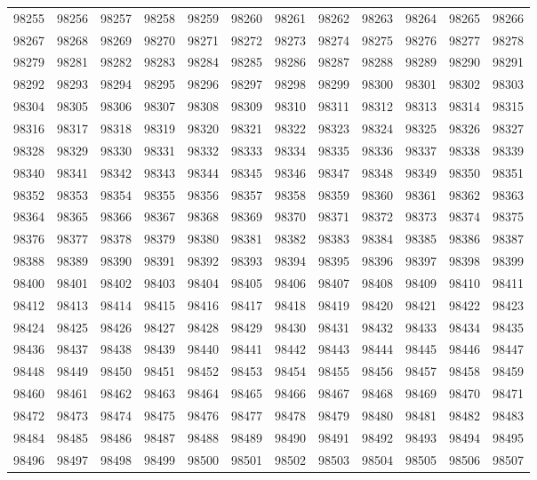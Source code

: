\begin{center}
\begin{longtable}{llllllllllll}
98255 &98256 &98257 &98258 &98259 &98260 &98261 &98262 &98263 &98264 &98265 &98266 \\
98267 &98268 &98269 &98270 &98271 &98272 &98273 &98274 &98275 &98276 &98277 &98278 \\
98279 &98281 &98282 &98283 &98284 &98285 &98286 &98287 &98288 &98289 &98290 &98291 \\
98292 &98293 &98294 &98295 &98296 &98297 &98298 &98299 &98300 &98301 &98302 &98303 \\
98304 &98305 &98306 &98307 &98308 &98309 &98310 &98311 &98312 &98313 &98314 &98315 \\
98316 &98317 &98318 &98319 &98320 &98321 &98322 &98323 &98324 &98325 &98326 &98327 \\
98328 &98329 &98330 &98331 &98332 &98333 &98334 &98335 &98336 &98337 &98338 &98339 \\
98340 &98341 &98342 &98343 &98344 &98345 &98346 &98347 &98348 &98349 &98350 &98351 \\
98352 &98353 &98354 &98355 &98356 &98357 &98358 &98359 &98360 &98361 &98362 &98363 \\
98364 &98365 &98366 &98367 &98368 &98369 &98370 &98371 &98372 &98373 &98374 &98375 \\
98376 &98377 &98378 &98379 &98380 &98381 &98382 &98383 &98384 &98385 &98386 &98387 \\
98388 &98389 &98390 &98391 &98392 &98393 &98394 &98395 &98396 &98397 &98398 &98399 \\
98400 &98401 &98402 &98403 &98404 &98405 &98406 &98407 &98408 &98409 &98410 &98411 \\
98412 &98413 &98414 &98415 &98416 &98417 &98418 &98419 &98420 &98421 &98422 &98423 \\
98424 &98425 &98426 &98427 &98428 &98429 &98430 &98431 &98432 &98433 &98434 &98435 \\
98436 &98437 &98438 &98439 &98440 &98441 &98442 &98443 &98444 &98445 &98446 &98447 \\
98448 &98449 &98450 &98451 &98452 &98453 &98454 &98455 &98456 &98457 &98458 &98459 \\
98460 &98461 &98462 &98463 &98464 &98465 &98466 &98467 &98468 &98469 &98470 &98471 \\
98472 &98473 &98474 &98475 &98476 &98477 &98478 &98479 &98480 &98481 &98482 &98483 \\
98484 &98485 &98486 &98487 &98488 &98489 &98490 &98491 &98492 &98493 &98494 &98495 \\
98496 &98497 &98498 &98499 &98500 &98501 &98502 &98503 &98504 &98505 &98506 &98507 \\

\end{longtable}
\end{center}

